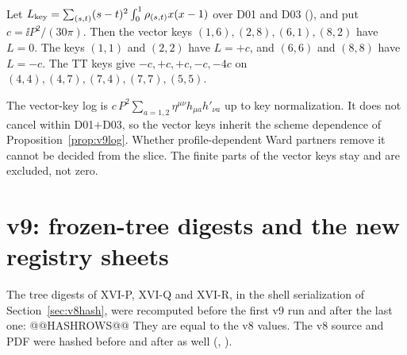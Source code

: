 \begin{proposition}
\label{prop:v9vector}
Let \(L_{\rm key}=\sum_{(s,t)}(s-t)^2\int_0^1\rho_{(s,t)}x(x-1)\)
over D01 and D03 (), and put
\(c=\ii P^2/(30\pi)\). Then the vector keys \((1,6),(2,8),(6,1),(8,2)\)
have \(L=0\). The keys \((1,1)\) and \((2,2)\) have \(L=+c\), and
\((6,6)\) and \((8,8)\) have \(L=-c\). The TT keys give
\(-c,+c,+c,-c,-4c\) on \((4,4),(4,7),(7,4),(7,7),(5,5)\).
\end{proposition}

The vector-key log is
\(c\,P^2\sum_{a=1,2}\eta^{\mu\nu}h_{\mu a}h'_{\nu a}\) up to key
normalization. It does not cancel within D01\(+\)D03, so the
vector keys inherit the scheme dependence of
Proposition~\ref{prop:v9log}. Whether profile-dependent Ward
partners remove it cannot be decided from the slice. The finite
parts of the vector keys stay \OPEN{} and are excluded, not zero.

\section{v9: frozen-tree digests and the new registry sheets}
\label{sec:v9hash}
\label{sec:v9sheets}

The tree digests of XVI-P, XVI-Q and XVI-R, in the shell
serialization of Section~\ref{sec:v8hash}, were recomputed before
the first v9 run and after the last one:
@@HASHROWS@@
They are equal to the v8 values. The v8 source and PDF were
hashed before and after as well
(, ).

